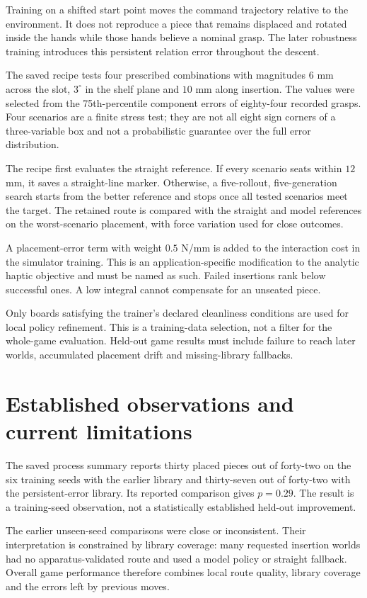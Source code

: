 Training on a shifted start point moves the command trajectory relative to the environment. It does not reproduce a piece that remains displaced and rotated inside the hands while those hands believe a nominal grasp. The later robustness training introduces this persistent relation error throughout the descent.

The saved recipe tests four prescribed combinations with magnitudes $6$ mm across the slot, $3^\circ$ in the shelf plane and $10$ mm along insertion. The values were selected from the 75th-percentile component errors of eighty-four recorded grasps. Four scenarios are a finite stress test; they are not all eight sign corners of a three-variable box and not a probabilistic guarantee over the full error distribution.

The recipe first evaluates the straight reference. If every scenario seats within $12$ mm, it saves a straight-line marker. Otherwise, a five-rollout, five-generation search starts from the better reference and stops once all tested scenarios meet the target. The retained route is compared with the straight and model references on the worst-scenario placement, with force variation used for close outcomes.

A placement-error term with weight $0.5$ N/mm is added to the interaction cost in the simulator training. This is an application-specific modification to the analytic haptic objective and must be named as such. Failed insertions rank below successful ones. A low integral cannot compensate for an unseated piece.

Only boards satisfying the trainer's declared cleanliness conditions are used for local policy refinement. This is a training-data selection, not a filter for the whole-game evaluation. Held-out game results must include failure to reach later worlds, accumulated placement drift and missing-library fallbacks.

\section{Established observations and current limitations}

The saved process summary reports thirty placed pieces out of forty-two on the six training seeds with the earlier library and thirty-seven out of forty-two with the persistent-error library. Its reported comparison gives $p=0.29$. The result is a training-seed observation, not a statistically established held-out improvement.

The earlier unseen-seed comparisons were close or inconsistent. Their interpretation is constrained by library coverage: many requested insertion worlds had no apparatus-validated route and used a model policy or straight fallback. Overall game performance therefore combines local route quality, library coverage and the errors left by previous moves.


